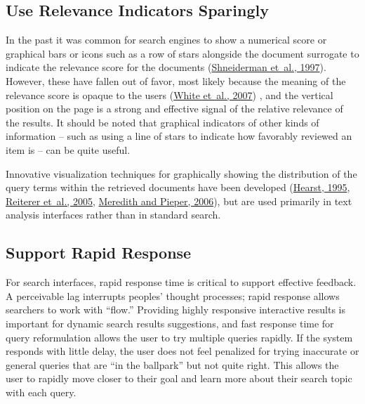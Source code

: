 \documentclass[sigconf,nonacm,screen,pbalance]{acmart}
\begin{document}
\subsection{Use Relevance Indicators Sparingly}

In the past it was common for search engines to show a numerical score or graphical bars or icons such
as a row of stars alongside the document surrogate to indicate the relevance score for the documents (\href{https://searchuserinterfaces.com/book/sui_references.html#shneiderman1997csu}{Shneiderman et~al., 1997}). However, these have fallen out of
favor, most likely because the meaning of the relevance score is opaque to the users (\href{https://searchuserinterfaces.com/book/sui_references.html#white2007sup}{White et~al., 2007}) , and the vertical position on the page is a strong and effective signal of the
relative relevance of the results. It should be noted that graphical indicators of other kinds of
information -- such as using a line of stars to indicate how favorably reviewed an item is -- can be
quite useful.

Innovative visualization techniques for graphically showing the distribution of the query terms within
the retrieved documents have been developed (\href{https://searchuserinterfaces.com/book/sui_references.html#hearst95b}{Hearst, 1995}, \href{https://searchuserinterfaces.com/book/sui_references.html#reiterer2005aic}{ Reiterer et~al., 2005}, \href{https://searchuserinterfaces.com/book/sui_references.html#meredith06}{ Meredith and Pieper, 2006}), but are used primarily in text
analysis interfaces rather than in standard search.

\subsection{Support Rapid Response}

For search interfaces, rapid response time is critical to support effective feedback. A perceivable lag
interrupts peoples' thought processes; rapid response allows searchers to work with ``flow.'' Providing
highly responsive interactive results is important for dynamic search results suggestions, and fast
response time for query reformulation allows the user to try multiple queries rapidly. If the system
responds with little delay, the user does not feel penalized for trying inaccurate or general queries
that are ``in the ballpark'' but not quite right. This allows the user to rapidly move closer to their
goal and learn more about their search topic with each query.
\end{document}
